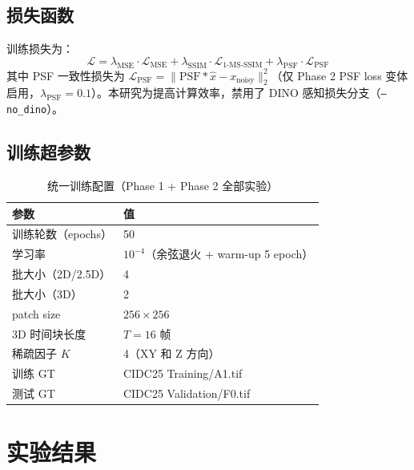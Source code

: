 \documentclass[UTF8, scheme=plain, 11pt, a4paper]{ctexart}
\begin{document}
\subsection{损失函数}

训练损失为：
\begin{equation}
  \mathcal{L} = \lambda_{\text{MSE}} \cdot \mathcal{L}_{\text{MSE}}
              + \lambda_{\text{SSIM}} \cdot \mathcal{L}_{\text{1-MS-SSIM}}
              + \lambda_{\text{PSF}} \cdot \mathcal{L}_{\text{PSF}}
\end{equation}
其中 PSF 一致性损失为 $\mathcal{L}_{\text{PSF}} = \|\text{PSF} * \hat{x} - x_{\text{noisy}}\|^2_2$（仅 Phase 2 PSF loss 变体启用，$\lambda_{\text{PSF}}=0.1$）。本研究为提高计算效率，禁用了 DINO 感知损失分支（\texttt{--no\_dino}）。

\subsection{训练超参数}

\begin{table}[H]
  \centering
  \caption{统一训练配置（Phase 1 + Phase 2 全部实验）}
  \begin{tabular}{ll}
    \toprule
    参数 & 值 \\
    \midrule
    训练轮数（epochs）  & 50 \\
    学习率              & $10^{-4}$（余弦退火 + warm-up 5 epoch） \\
    批大小（2D/2.5D）   & 4 \\
    批大小（3D）        & 2 \\
    patch size          & $256 \times 256$ \\
    3D 时间块长度       & $T=16$ 帧 \\
    稀疏因子 $K$        & 4（XY 和 Z 方向） \\
    训练 GT             & CIDC25 Training/A1.tif \\
    测试 GT             & CIDC25 Validation/F0.tif \\
    \bottomrule
  \end{tabular}
\end{table}

\section{实验结果}
\end{document}
